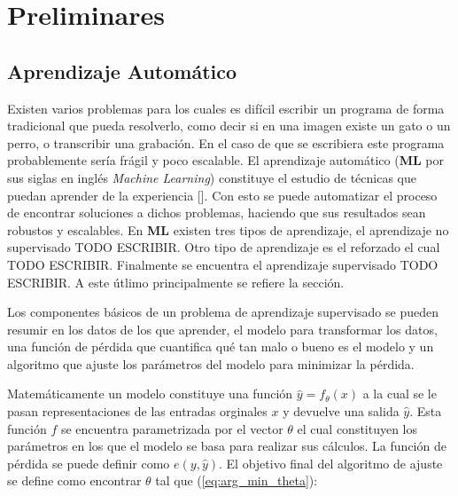 \chapter{Preliminares}\label{chapter:background}


\section{Aprendizaje Automático}

Existen varios problemas para los cuales es difícil escribir un programa de forma tradicional que pueda
resolverlo, como decir si en una imagen existe un gato o un perro, o transcribir una grabación. En el caso
de que se escribiera este programa probablemente sería frágil y poco escalable. El aprendizaje automático
(\textbf{ML} por sus siglas en inglés \emph{Machine Learning}) constituye el estudio de técnicas que puedan 
aprender de la experiencia [\cite{d2l}]. Con esto se puede automatizar el proceso de encontrar soluciones a 
dichos problemas, haciendo que sus resultados sean robustos y escalables. En \textbf{ML} existen tres tipos de 
aprendizaje, el aprendizaje no supervisado TODO ESCRIBIR. Otro tipo de aprendizaje es el reforzado el cual 
TODO ESCRIBIR. Finalmente se encuentra el aprendizaje supervisado TODO ESCRIBIR. A este útlimo principalmente 
se refiere la sección.

Los componentes básicos de un problema de aprendizaje supervisado se pueden resumir en los datos de los que 
aprender, el modelo para transformar los datos, una función de pérdida que cuantifica qué tan malo o bueno es el 
modelo y un algoritmo que ajuste los parámetros del modelo para minimizar la pérdida.

Matemáticamente un modelo constituye una función $\hat{y} = f_{\theta}(x)$ a la cual se 
le pasan representaciones de las entradas orginales $x$ y devuelve una salida $\hat{y}$. Esta función $f$ se encuentra
parametrizada por el vector $\theta$ el cual constituyen los parámetros en los que el modelo se basa para realizar sus
cálculos. La función de pérdida se puede definir como $e(y, \hat{y})$. El objetivo final del algoritmo de ajuste 
se define como encontrar $\theta$ tal que (\ref{eq:arg_min_theta}):

